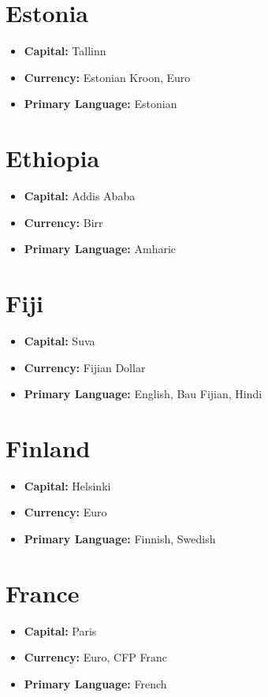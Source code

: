 \documentclass[a4paper,100pt,twoside]{book}
\begin{document}
\section*{\Huge Estonia}
\vspace{5mm} %
\begin{itemize}
	\item \textbf{Capital:} Tallinn
	\item \textbf{Currency:} Estonian Kroon, Euro
	\item \textbf{Primary Language:} Estonian
\end{itemize}

\section*{\Huge Ethiopia}
\vspace{5mm} %
\begin{itemize}
	\item \textbf{Capital:} Addis Ababa
	\item \textbf{Currency:} Birr
	\item \textbf{Primary Language:} Amharic
\end{itemize}

\section*{\Huge Fiji}
\vspace{5mm} %
\begin{itemize}
	\item \textbf{Capital:} Suva
	\item \textbf{Currency:} Fijian Dollar
	\item \textbf{Primary Language:} English, Bau Fijian, Hindi
\end{itemize}

\section*{\Huge Finland}
\vspace{5mm} %
\begin{itemize}
	\item \textbf{Capital:} Helsinki
	\item \textbf{Currency:} Euro
	\item \textbf{Primary Language:} Finnish, Swedish
\end{itemize}

\section*{\Huge France}
\vspace{5mm} %
\begin{itemize}
	\item \textbf{Capital:} Paris
	\item \textbf{Currency:} Euro, CFP Franc
	\item \textbf{Primary Language:} French
\end{itemize}
\end{document}

